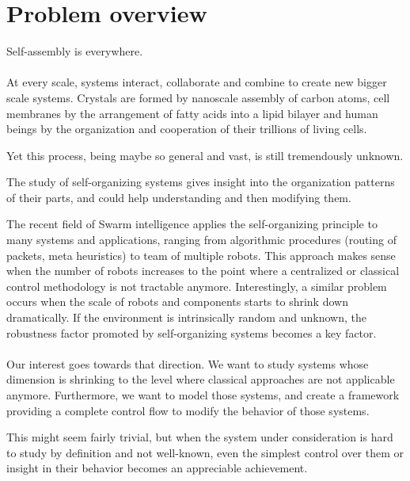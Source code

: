 \section{Problem overview} %
\label{sec:problem_overview}

	Self-assembly is everywhere.
	
	\paragraph{}

	At every scale, systems interact, collaborate and combine to create new bigger scale systems. Crystals are formed by nanoscale assembly of carbon atoms, cell membranes by the arrangement of fatty acids into a lipid bilayer and human beings by the organization and cooperation of their trillions of living cells.

	Yet this process, being maybe so general and vast, is still tremendously unknown.

	The study of self-organizing systems gives insight into the organization patterns of their parts, and could help understanding and then modifying them.

	The recent field of Swarm intelligence applies the self-organizing principle to many systems and applications, ranging from algorithmic procedures (routing of packets, meta heuristics) to team of multiple robots. This approach makes sense when the number of robots increases to the point where a centralized or classical control methodology is not tractable anymore.
Interestingly, a similar problem occurs when the scale of robots and components starts to shrink down dramatically. If the environment is intrinsically random and unknown, the robustness factor promoted by self-organizing systems becomes a key factor.

	\paragraph{}
	Our interest goes towards that direction. We want to study systems whose dimension is shrinking to the level where classical approaches are not applicable anymore. Furthermore, we want to model those systems, and create a framework providing a complete control flow to modify the behavior of those systems.

	This might seem fairly trivial, but when the system under consideration is hard to study by definition and not well-known, even the simplest control over them or insight in their behavior becomes an appreciable achievement.

